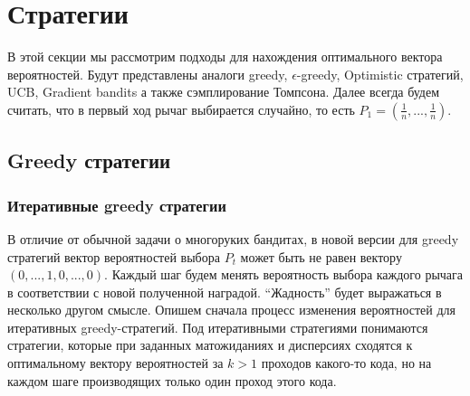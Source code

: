 \documentclass{article}
\begin{document}
\section{Стратегии}

В этой секции мы рассмотрим подходы для нахождения оптимального вектора вероятностей. Будут представлены аналоги greedy, $\epsilon$-greedy, Optimistic стратегий, UCB, Gradient bandits а также сэмплирование Томпсона. Далее всегда будем считать, что в первый ход рычаг выбирается случайно, то есть $P_1 = \left( \frac{1}{n}, ..., \frac{1}{n} \right)$.

\subsection{Greedy стратегии}

\subsubsection{Итеративные greedy стратегии}

В отличие от обычной задачи о многоруких бандитах, в новой версии для greedy стратегий вектор вероятностей выбора $P_t$ может быть не равен вектору $(0, ..., 1, 0, ..., 0)$. Каждый шаг будем менять вероятность выбора каждого рычага в соответствии с новой полученной наградой. ``Жадность'' будет выражаться в несколько другом смысле. Опишем сначала процесс изменения вероятностей для итеративных greedy-стратегий. Под итеративными стратегиями понимаются стратегии, которые при заданных матожиданиях и дисперсиях сходятся к оптимальному вектору вероятностей за $k > 1$ проходов какого-то кода, но на каждом шаге производящих только один проход этого кода.
\end{document}

